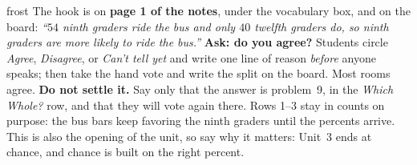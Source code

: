 \documentclass[10pt]{article}
\begin{document}
\boxguard
\begin{skillbox}{frost}
The hook is on \textbf{page 1 of the notes}, under the vocabulary box, and on the board:
\textit{``$54$ ninth graders ride the bus and only $40$ twelfth graders do, so ninth graders are
more likely to ride the bus.''} \textbf{Ask: do you agree?} Students circle \emph{Agree},
\emph{Disagree}, or \emph{Can't tell yet} and write one line of reason \emph{before} anyone
speaks; then take the hand vote and write the split on the board. Most rooms agree. \textbf{Do
not settle it.} Say only that the answer is problem~9, in the \emph{Which Whole?} row, and that
they will vote again there. Rows 1--3 stay in counts on purpose: the bus bars keep favoring the
ninth graders until the percents arrive. This is also the opening of the unit, so say why it
matters: Unit~3 ends at chance, and chance is built on the right percent.
\end{skillbox}
\end{document}
